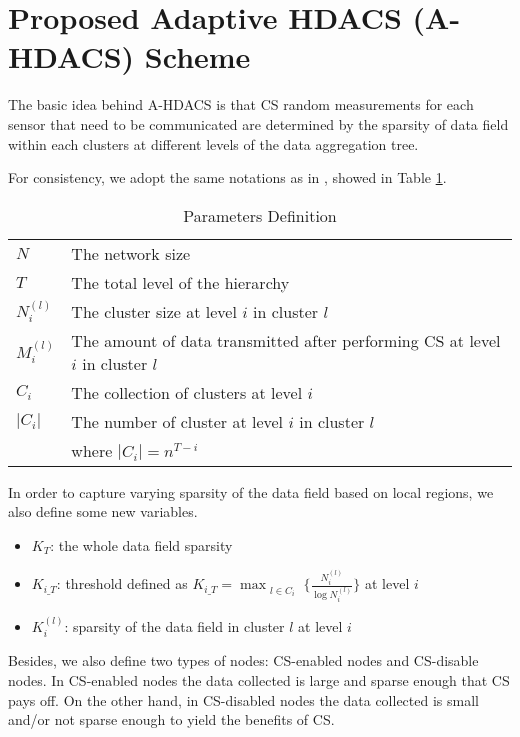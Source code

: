 \documentclass[conference]{IEEEtran}
\begin{document}
\section{Proposed Adaptive HDACS (A-HDACS) Scheme}
The basic idea behind A-HDACS is that CS random measurements for 
each sensor that need to be communicated are determined by the sparsity of data field 
within each clusters at different levels of the data aggregation tree.

For consistency, we adopt the same notations as in \cite{HDACS},  showed in Table \ref{ParaDef1}. 

\begin{table}[!t]
\centering
\caption{Parameters Definition} \label{ParaDef1}
\begin{tabular}{ |l|l| }
  \hline
 $N$           & The network size\\
 $T$           & The total level of the hierarchy\\
 $N_i^{(l)}$ & The cluster size at level $i$ in cluster $l$\\ 
 $M_i^{(l)}$ & The amount of data transmitted after performing CS at level $i$ in cluster $l$\\
 $C_i$        & The collection of clusters at level $i$\\
 $|C_{i}|$    & The number of cluster at level $i$ in cluster $l$\\
                  & where $|C_{i}| = n^{T-i}$\\
   \hline
\end{tabular}
\end{table}

In order to capture varying sparsity of the data field based on local regions, we also define some new variables.
\begin{itemize}
  \item $K_T$: the whole data field sparsity\\
  \item $K_{i\_T}$: threshold defined as
  $K_{i\_T}= \max_{\substack{l \in C_i}} \{ \frac{N_i^{(l)}}{\log{N_i^{(l)}}} \}$ at level $i$\\
  \item $K_i^{(l)}$: sparsity of the data field in cluster $l$ at level $i$\\    
\end{itemize}

Besides, we also define two types of nodes: CS-enabled nodes and 
CS-disable nodes. In CS-enabled nodes the data collected is large and sparse enough that CS pays off.
On the other hand, in CS-disabled nodes the data collected is small and/or not sparse enough to yield the benefits of CS.  
\end{document}

